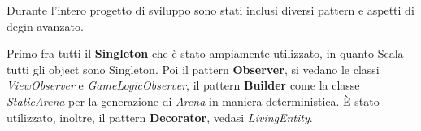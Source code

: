 Durante l'intero progetto di sviluppo sono stati inclusi diversi pattern e aspetti di degin avanzato.

Primo fra tutti il \textbf{Singleton} che è stato ampiamente utilizzato, in quanto Scala tutti gli object sono Singleton.
Poi il pattern \textbf{Observer}, si vedano le classi \textit{ViewObserver} e \textit{GameLogicObserver}, il pattern \textbf{Builder} come la classe \textit{StaticArena} per la generazione di \textit{Arena} in maniera deterministica.
\`E stato utilizzato, inoltre, il pattern \textbf{Decorator}, vedasi \textit{LivingEntity}.